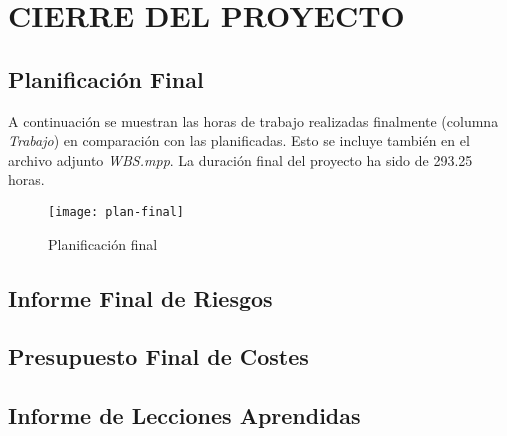 \newpage
\section{CIERRE DEL PROYECTO}

\subsection{Planificación Final}
A continuación se muestran las horas de trabajo realizadas finalmente (columna \textit{Trabajo}) en comparación con las planificadas. Esto se incluye también en el archivo adjunto \textit{WBS.mpp}. La duración final del proyecto ha sido de 293.25 horas.
\newpage
\pagestyle{empty}
\begin{figure}[H]
\vspace{-25mm}
\centering
\centerline{\texttt{[image: plan-final]}}
\caption{Planificación final}
\end{figure} 
\newpage
\pagestyle{fancy}
\subsection{Informe Final de Riesgos}

\subsection{Presupuesto Final de Costes}

\subsection{Informe de Lecciones Aprendidas}
